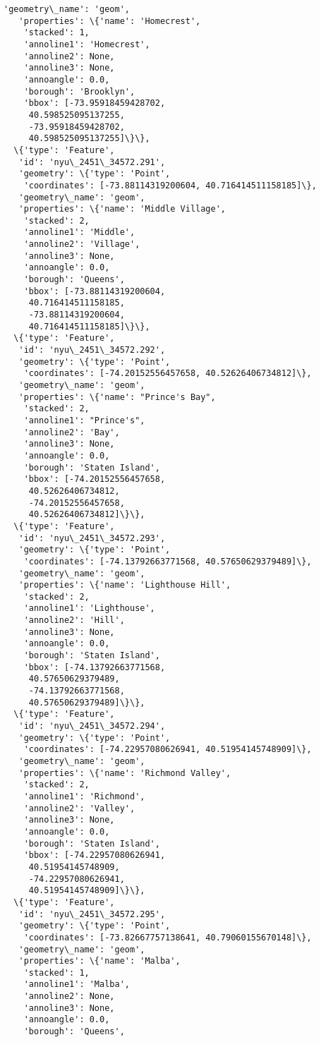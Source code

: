 \documentclass[11pt]{article}
\begin{document}
\begin{tcolorbox}[breakable, size=fbox, boxrule=.5pt, pad at break*=1mm, opacityfill=0]
\begin{Verbatim}[commandchars=\\\{\}]
   'geometry\_name': 'geom',
   'properties': \{'name': 'Homecrest',
    'stacked': 1,
    'annoline1': 'Homecrest',
    'annoline2': None,
    'annoline3': None,
    'annoangle': 0.0,
    'borough': 'Brooklyn',
    'bbox': [-73.95918459428702,
     40.598525095137255,
     -73.95918459428702,
     40.598525095137255]\}\},
  \{'type': 'Feature',
   'id': 'nyu\_2451\_34572.291',
   'geometry': \{'type': 'Point',
    'coordinates': [-73.88114319200604, 40.716414511158185]\},
   'geometry\_name': 'geom',
   'properties': \{'name': 'Middle Village',
    'stacked': 2,
    'annoline1': 'Middle',
    'annoline2': 'Village',
    'annoline3': None,
    'annoangle': 0.0,
    'borough': 'Queens',
    'bbox': [-73.88114319200604,
     40.716414511158185,
     -73.88114319200604,
     40.716414511158185]\}\},
  \{'type': 'Feature',
   'id': 'nyu\_2451\_34572.292',
   'geometry': \{'type': 'Point',
    'coordinates': [-74.20152556457658, 40.52626406734812]\},
   'geometry\_name': 'geom',
   'properties': \{'name': "Prince's Bay",
    'stacked': 2,
    'annoline1': "Prince's",
    'annoline2': 'Bay',
    'annoline3': None,
    'annoangle': 0.0,
    'borough': 'Staten Island',
    'bbox': [-74.20152556457658,
     40.52626406734812,
     -74.20152556457658,
     40.52626406734812]\}\},
  \{'type': 'Feature',
   'id': 'nyu\_2451\_34572.293',
   'geometry': \{'type': 'Point',
    'coordinates': [-74.13792663771568, 40.57650629379489]\},
   'geometry\_name': 'geom',
   'properties': \{'name': 'Lighthouse Hill',
    'stacked': 2,
    'annoline1': 'Lighthouse',
    'annoline2': 'Hill',
    'annoline3': None,
    'annoangle': 0.0,
    'borough': 'Staten Island',
    'bbox': [-74.13792663771568,
     40.57650629379489,
     -74.13792663771568,
     40.57650629379489]\}\},
  \{'type': 'Feature',
   'id': 'nyu\_2451\_34572.294',
   'geometry': \{'type': 'Point',
    'coordinates': [-74.22957080626941, 40.51954145748909]\},
   'geometry\_name': 'geom',
   'properties': \{'name': 'Richmond Valley',
    'stacked': 2,
    'annoline1': 'Richmond',
    'annoline2': 'Valley',
    'annoline3': None,
    'annoangle': 0.0,
    'borough': 'Staten Island',
    'bbox': [-74.22957080626941,
     40.51954145748909,
     -74.22957080626941,
     40.51954145748909]\}\},
  \{'type': 'Feature',
   'id': 'nyu\_2451\_34572.295',
   'geometry': \{'type': 'Point',
    'coordinates': [-73.82667757138641, 40.79060155670148]\},
   'geometry\_name': 'geom',
   'properties': \{'name': 'Malba',
    'stacked': 1,
    'annoline1': 'Malba',
    'annoline2': None,
    'annoline3': None,
    'annoangle': 0.0,
    'borough': 'Queens',

\end{Verbatim}
\end{tcolorbox}
\end{document}
